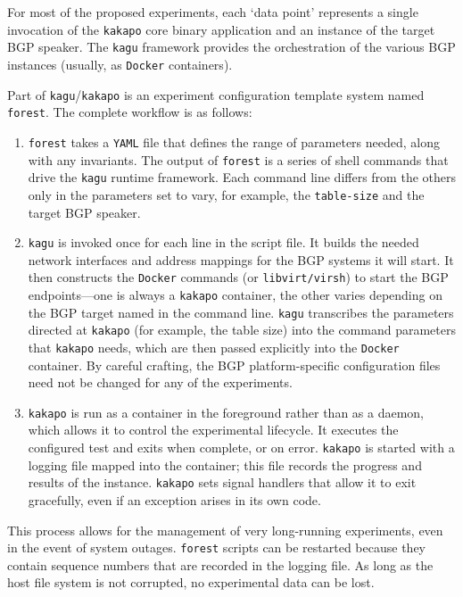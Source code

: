 For most of the proposed experiments, each `data point' represents a single invocation of the \texttt{kakapo} core binary application and an instance of the target BGP speaker. The \texttt{kagu} framework provides the orchestration of the various BGP instances (usually, as \texttt{Docker} containers).

Part of \texttt{kagu}/\texttt{kakapo} is an experiment configuration template system named \texttt{forest}. The complete workflow is as follows:
\begin{enumerate}
    \item \texttt{forest} takes a \texttt{YAML} file that defines the range of parameters needed, along with any invariants. The output of \texttt{forest} is a series of shell commands that drive the \texttt{kagu} runtime framework. Each command line differs from the others only in the parameters set to vary, for example, the \texttt{table-size} and the target BGP speaker.

    \item \texttt{kagu} is invoked once for each line in the script file. It builds the needed network interfaces and address mappings for the BGP systems it will start. It then constructs the \texttt{Docker} commands (or \texttt{libvirt/virsh}) to start the BGP endpoints---one is always a \texttt{kakapo} container, the other varies depending on the BGP target named in the command line. \texttt{kagu} transcribes the parameters directed at \texttt{kakapo} (for example, the table size) into the command parameters that \texttt{kakapo} needs, which are then passed explicitly into the \texttt{Docker} container. By careful crafting, the BGP platform-specific configuration files need not be changed for any of the experiments.

    \item \texttt{kakapo} is run as a container in the foreground rather than as a daemon, which allows it to control the experimental lifecycle. It executes the configured test and exits when complete, or on error. \texttt{kakapo} is started with a logging file mapped into the container; this file records the progress and results of the instance. \texttt{kakapo} sets signal handlers that allow it to exit gracefully, even if an exception arises in its own code.
\end{enumerate}

This process allows for the management of very long-running experiments, even in the event of system outages. \texttt{forest} scripts can be restarted because they contain sequence numbers that are recorded in the logging file. As long as the host file system is not corrupted, no experimental data can be lost.


